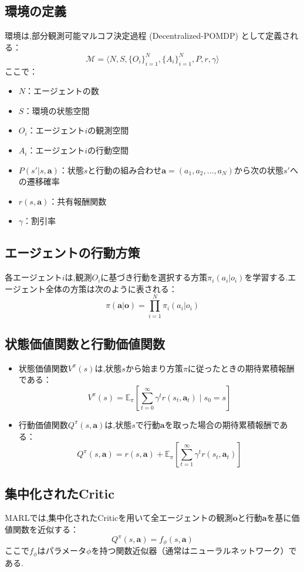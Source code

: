 \subsection*{環境の定義}
環境は,部分観測可能マルコフ決定過程 (Decentralized-POMDP) として定義される：
\[
\mathcal{M} = \langle N, S, \{O_i\}_{i=1}^N, \{A_i\}_{i=1}^N, P, r, \gamma \rangle
\]
ここで：
\begin{itemize}
    \item $N$：エージェントの数
    \item $S$：環境の状態空間
    \item $O_i$：エージェント$i$の観測空間
    \item $A_i$：エージェント$i$の行動空間
    \item $P(s' | s, \boldsymbol{a})$：状態$s$と行動の組み合わせ$\boldsymbol{a} = (a_1, a_2, \dots, a_N)$から次の状態$s'$への遷移確率
    \item $r(s, \boldsymbol{a})$：共有報酬関数
    \item $\gamma$：割引率
\end{itemize}

\subsection*{エージェントの行動方策}
各エージェント$i$は,観測$O_i$に基づき行動を選択する方策$\pi_i(a_i | o_i)$を学習する.エージェント全体の方策は次のように表される：
\[
\pi(\boldsymbol{a} | \boldsymbol{o}) = \prod_{i=1}^N \pi_i(a_i | o_i)
\]

\subsection*{状態価値関数と行動価値関数}
\begin{itemize}
    \item 状態価値関数$V^\pi(s)$は,状態$s$から始まり方策$\pi$に従ったときの期待累積報酬である：
    \[
    V^\pi(s) = \mathbb{E}_\pi \left[ \sum_{t=0}^\infty \gamma^t r(s_t, \boldsymbol{a}_t) \mid s_0 = s \right]
    \]
    \item 行動価値関数$Q^\pi(s, \boldsymbol{a})$は,状態$s$で行動$\boldsymbol{a}$を取った場合の期待累積報酬である：
    \[
    Q^\pi(s, \boldsymbol{a}) = r(s, \boldsymbol{a}) + \mathbb{E}_\pi \left[ \sum_{t=1}^\infty \gamma^t r(s_t, \boldsymbol{a}_t) \right]
    \]
\end{itemize}

\subsection*{集中化されたCritic}
MARLでは,集中化されたCriticを用いて全エージェントの観測$\boldsymbol{o}$と行動$\boldsymbol{a}$を基に価値関数を近似する：
\[
Q^\pi(s, \boldsymbol{a}) = f_\phi(s, \boldsymbol{a})
\]
ここで$f_\phi$はパラメータ$\phi$を持つ関数近似器（通常はニューラルネットワーク）である.

